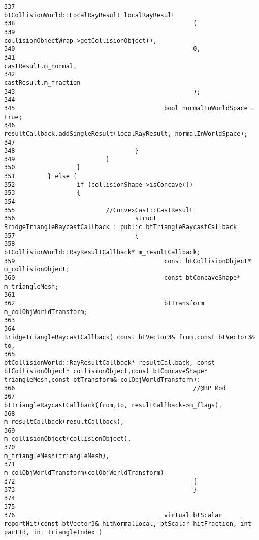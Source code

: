 \begin{Code}
\begin{verbatim}
337                                         btCollisionWorld::LocalRayResult localRayResult
338                                                 (
339                                                 collisionObjectWrap->getCollisionObject(),
340                                                 0,
341                                                 castResult.m_normal,
342                                                 castResult.m_fraction
343                                                 );
344 
345                                         bool normalInWorldSpace = true;
346                                         resultCallback.addSingleResult(localRayResult, normalInWorldSpace);
347 
348                                 }
349                         }
350                 }
351         } else {
352                 if (collisionShape->isConcave())
353                 {
354 
355                         //ConvexCast::CastResult
356                                 struct BridgeTriangleRaycastCallback : public btTriangleRaycastCallback
357                                 {
358                                         btCollisionWorld::RayResultCallback* m_resultCallback;
359                                         const btCollisionObject*        m_collisionObject;
360                                         const btConcaveShape*   m_triangleMesh;
361 
362                                         btTransform m_colObjWorldTransform;
363 
364                                         BridgeTriangleRaycastCallback( const btVector3& from,const btVector3& to,
365                                         btCollisionWorld::RayResultCallback* resultCallback, const btCollisionObject* collisionObject,const btConcaveShape*     triangleMesh,const btTransform& colObjWorldTransform):
366                                                 //@BP Mod
367                                                 btTriangleRaycastCallback(from,to, resultCallback->m_flags),
368                                                         m_resultCallback(resultCallback),
369                                                         m_collisionObject(collisionObject),
370                                                         m_triangleMesh(triangleMesh),
371                                                         m_colObjWorldTransform(colObjWorldTransform)
372                                                 {
373                                                 }
374 
375 
376                                         virtual btScalar reportHit(const btVector3& hitNormalLocal, btScalar hitFraction, int partId, int triangleIndex )

\end{verbatim}
\end{Code}
